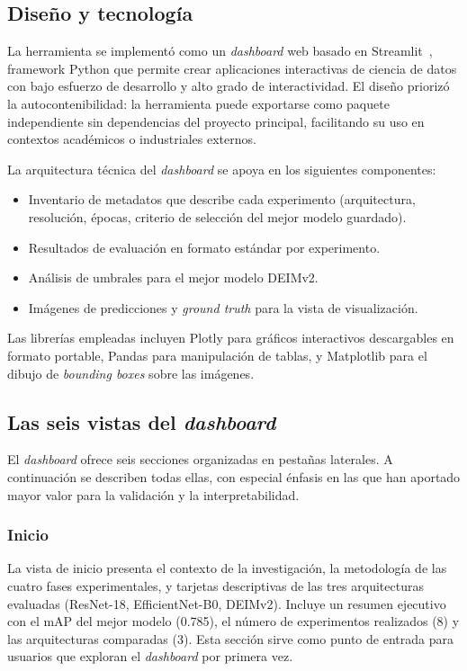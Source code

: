\subsection{Diseño y tecnología}

La herramienta se implementó como un \textit{dashboard} web basado en \acrfull{Streamlit}~\cite{streamlit2024}, framework Python que permite crear aplicaciones interactivas de ciencia de datos con bajo esfuerzo de desarrollo y alto grado de interactividad. El diseño priorizó la autocontenibilidad: la herramienta puede exportarse como paquete independiente sin dependencias del proyecto principal, facilitando su uso en contextos académicos o industriales externos.

La arquitectura técnica del \textit{dashboard} se apoya en los siguientes componentes:

\begin{itemize}
    \item Inventario de metadatos que describe cada experimento (arquitectura, resolución, épocas, criterio de selección del mejor modelo guardado).
    \item Resultados de evaluación en formato estándar por experimento.
    \item Análisis de umbrales para el mejor modelo DEIMv2.
    \item Imágenes de predicciones y \textit{ground truth} para la vista de visualización.
\end{itemize}

Las librerías empleadas incluyen Plotly para gráficos interactivos descargables en formato portable, Pandas para manipulación de tablas, y Matplotlib para el dibujo de \textit{bounding boxes} sobre las imágenes.

\subsection{Las seis vistas del \textit{dashboard}}

El \textit{dashboard} ofrece seis secciones organizadas en pestañas laterales. A continuación se describen todas ellas, con especial énfasis en las que han aportado mayor valor para la validación y la interpretabilidad.

\subsubsection{Inicio}

La vista de inicio presenta el contexto de la investigación, la metodología de las cuatro fases experimentales, y tarjetas descriptivas de las tres arquitecturas evaluadas (ResNet-18, EfficientNet-B0, DEIMv2). Incluye un resumen ejecutivo con el mAP del mejor modelo (0.785), el número de experimentos realizados (8) y las arquitecturas comparadas (3). Esta sección sirve como punto de entrada para usuarios que exploran el \textit{dashboard} por primera vez.

